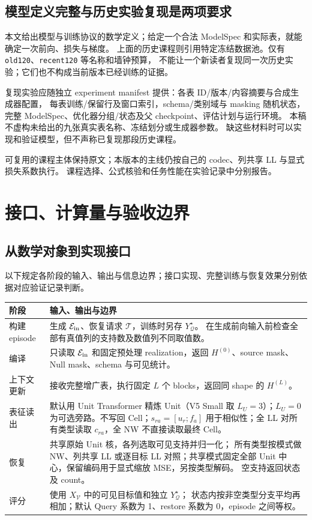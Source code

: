 \documentclass[11pt,UTF8,fontset=fandol]{ctexart}
\numberwithin{equation}{section}
\theoremstyle{definition}
\newcommand{\Vset}{\mathcal V}
\newcommand{\Qset}{\mathcal Q}
\newcommand{\TargetSet}{\mathcal T}
\newcommand{\Eset}{\mathcal E}
\begin{document}

\subsection{模型定义完整与历史实验复现是两项要求}
\label{v53:sec:manifest}
本文给出模型与训练协议的数学定义；给定一个合法 ModelSpec 和实际表，就能确定一次前向、损失与梯度。
上面的历史课程则引用特定冻结数据池。仅有 \texttt{old120}、\texttt{recent120} 等名称和墙钟预算，
不能让一个新读者复现同一次历史实验；它们也不构成当前版本已经训练的证据。

复现实验应随独立 experiment manifest 提供：各表 ID/版本/内容摘要与合成生成器配置，
每表训练/保留行及窗口索引，schema/类别域与 masking 随机状态，
完整 ModelSpec、优化器分组/状态及父 checkpoint、评估计划与运行环境。
本稿不虚构未给出的九张真实表名称、冻结划分或生成器参数。
缺这些材料时可以实现和验证模型，但不声称已复现那段历史课程。

可复用的课程主体保持原文；本版本的主线仍按自己的 codec、列共享 LL 与显式损失系数执行。
课程选择、公式核验和任务性能在实验记录中分别报告。

\section{接口、计算量与验收边界}
\label{sec:T:runtime}
\subsection{从数学对象到实现接口}
以下规定各阶段的输入、输出与信息边界；接口实现、完整训练与恢复效果分别依据对应验证记录判断。
\begin{center}
\small
\begin{tabularx}{\linewidth}{lX}
\toprule
阶段 & 输入、输出与边界\\
\midrule
构建 episode & 生成 $\Eset_{\rm in}$、恢复请求 $\TargetSet$，训练时另存 $Y^\star_{\Qset}$。
在生成前向输入前检查全部有真值列的支持数及数值列不同取值数。\\
编译 & 只读取 $\Eset_{\rm in}$ 和固定预处理 realization，返回
$H^{(0)}$、source mask、Null mask、schema 与可见统计。\\
上下文更新 & 接收完整增广表，执行固定 $L$ 个 blocks，返回同 shape 的 $H^{(L)}$。\\
表征读出 & 默认用 Unit Transformer 精炼 Unit（V5 Small 取 $L_U=3$）；$L_U=0$ 为可选旁路。不写回 Cell；$s_{ra}=[u_r;f_a]$ 用于相似性；全 LL 对所有类型读取 $c_{ra}$，全 NW 不直接读取最终 Cell。\\
恢复 & 共享原始 Unit 核，各列选取可见支持并归一化；
所有类型按模式做 NW、列共享 LL 或逐目标 LL 对照；共享模式固定全部 Unit 中心，保留编码用于显式缩放 MSE，另按类型解码。
空支持返回状态及 count。\\
评分 & 使用 $X_{\Vset}$ 中的可见目标值和独立 $Y^\star_{\Qset}$；
状态内按非空类型分支平均再相加；默认 Query 系数为 1、restore 系数为 0，episode 之间等权。\\
\bottomrule
\end{tabularx}
\end{center}
\end{document}

